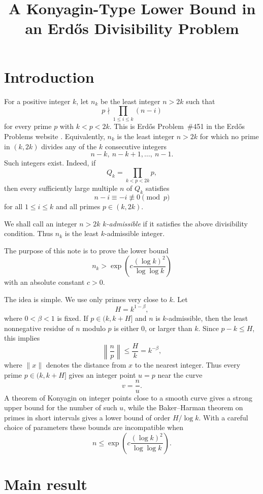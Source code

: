 \documentclass[11pt]{article}
\title{A Konyagin-Type Lower Bound in an Erd\H{o}s Divisibility Problem}
\author{}
\date{}
\begin{document}
\maketitle

\section{Introduction}

For a positive integer \(k\), let \(n_k\) be the least integer \(n>2k\) such
that
\[
        p\nmid \prod_{1\le i\le k}(n-i)
\]
for every prime \(p\) with \(k<p<2k\). This is Erd\H{o}s Problem~\#451 in the
Erd\H{o}s Problems website \cite{ErdosProblems451}. Equivalently, \(n_k\)
is the least integer \(n>2k\) for which no prime in \((k,2k)\) divides any of
the \(k\) consecutive integers
\[
        n-k,\ n-k+1,\ldots,\ n-1 .
\]
Such integers exist. Indeed, if
\[
        Q_k=\prod_{k<p<2k}p,
\]
then every sufficiently large multiple \(n\) of \(Q_k\) satisfies
\[
        n-i\equiv -i\not\equiv 0\pmod p
\]
for all \(1\le i\le k\) and all primes \(p\in(k,2k)\).

We shall call an integer \(n>2k\) \emph{\(k\)-admissible} if it satisfies the
above divisibility condition. Thus \(n_k\) is the least \(k\)-admissible
integer.

The purpose of this note is to prove the lower bound
\[
        n_k>
        \exp\!\left(
        c\frac{(\log k)^2}{\log\log k}
        \right)
\]
with an absolute constant \(c>0\).

The idea is simple. We use only primes very close to \(k\). Let
\[
        H=k^{1-\beta},
\]
where \(0<\beta<1\) is fixed. If \(p\in(k,k+H]\) and \(n\) is
\(k\)-admissible, then the least nonnegative residue of \(n\) modulo \(p\) is
either \(0\), or larger than \(k\). Since \(p-k\le H\), this implies
\[
        \left\|\frac np\right\|\le \frac{H}{k}=k^{-\beta},
\]
where \(\|x\|\) denotes the distance from \(x\) to the nearest integer. Thus
every prime \(p\in(k,k+H]\) gives an integer point \(u=p\) near the curve
\[
        v=\frac{n}{u}.
\]
A theorem of Konyagin on integer points close to a smooth curve gives a strong
upper bound for the number of such \(u\), while the Baker--Harman theorem on
primes in short intervals gives a lower bound of order \(H/\log k\). With a
careful choice of parameters these bounds are incompatible when
\[
        n\le
        \exp\!\left(
        c\frac{(\log k)^2}{\log\log k}
        \right).
\]

\section{Main result}
\end{document}
